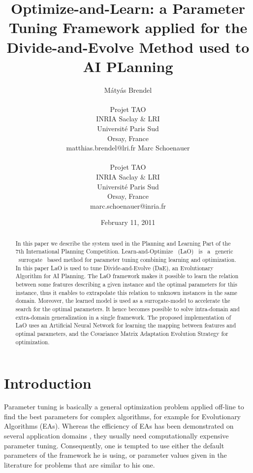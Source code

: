 \documentclass{article}
\begin{document}
\title{Optimize-and-Learn: a Parameter Tuning Framework applied for the Divide-and-Evolve Method used to AI PLanning}


\author{M{\'a}ty{\'a}s Brendel \\ \\ Projet TAO \\ INRIA Saclay \& LRI\\ Universit{\'e} Paris Sud \\ Orsay, France\\ matthias.brendel@lri.fr   
\And Marc Schoenauer \\ \\ Projet TAO \\ INRIA Saclay \& LRI\\ Universit{\'e} Paris Sud \\ Orsay, France\\ marc.schoenauer@inria.fr}



\date{February 11, 2011}
\maketitle
\begin{abstract}
\noindent In this paper we describe the system used in the Planning and Learning Part of the 7th International Planning Competition. Learn-and-Optimize ~(LaO) ~is ~a ~generic ~surrogate ~based method for parameter tuning combining learning and optimization. In this paper LaO is used to tune Divide-and-Evolve (DaE), an Evolutionary Algorithm for AI Planning. The LaO framework makes it possible to learn the relation between some features describing a given instance and the optimal parameters for this instance, thus it enables to extrapolate this relation to unknown instances in the same domain. Moreover, the learned model is used as a surrogate-model to accelerate the search for the optimal parameters. It hence becomes possible to solve intra-domain and extra-domain generalization in a single framework. The proposed implementation of LaO uses an Artificial Neural Network for learning the mapping between features and optimal parameters, and the Covariance Matrix Adaptation Evolution Strategy for optimization. 
\end{abstract}

\section{Introduction}

Parameter tuning is basically a general optimization problem applied off-line to find the best parameters for complex algorithms, for example for Evolutionary Algorithms (EAs). Whereas the efficiency of EAs has been demonstrated on several application domains \cite{practice08,ParameterSettingBook07}, they usually need computationally expensive parameter tuning. Consequently, one is tempted to use either the default parameters of the framework he is using, or parameter values given in the literature for problems that are similar to his one. 
\end{document}
